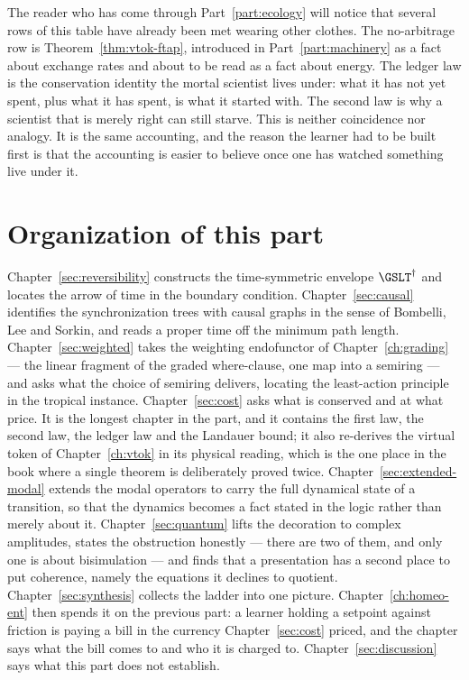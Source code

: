 The reader who has come through Part~\ref{part:ecology} will notice that
several rows of this table have already been met wearing other clothes.
The no-arbitrage row is Theorem~\ref{thm:vtok-ftap}, introduced in
Part~\ref{part:machinery} as a fact about exchange rates and about to be
read as a fact about energy.
The ledger law is the conservation identity the mortal scientist lives
under: what it has not yet spent, plus what it has spent, is what it
started with.
The second law is why a scientist that is merely right can still starve.
This is neither coincidence nor analogy.
It is the same accounting, and the reason the learner had to be built
first is that the accounting is easier to believe once one has watched
something live under it.

\section{Organization of this part}

Chapter~\ref{sec:reversibility} constructs the time-symmetric envelope
$\GSLT^\dagger$ and locates the arrow of time in the boundary condition.
Chapter~\ref{sec:causal} identifies the synchronization trees with causal
graphs in the sense of Bombelli, Lee and Sorkin, and reads a proper time
off the minimum path length.
Chapter~\ref{sec:weighted} takes the weighting endofunctor of
Chapter~\ref{ch:grading} --- the linear fragment of the graded where-clause,
one map into a semiring --- and asks what the choice of semiring delivers,
locating the least-action principle in the tropical instance.
Chapter~\ref{sec:cost} asks what is conserved and at what price.
It is the longest chapter in the part, and it contains the first law, the
second law, the ledger law and the Landauer bound; it also re-derives the
virtual token of Chapter~\ref{ch:vtok} in its physical reading, which is
the one place in the book where a single theorem is deliberately proved
twice.
Chapter~\ref{sec:extended-modal} extends the modal operators to carry the
full dynamical state of a transition, so that the dynamics becomes a fact
stated in the logic rather than merely about it.
Chapter~\ref{sec:quantum} lifts the decoration to complex amplitudes,
states the obstruction honestly --- there are two of them, and only one is
about bisimulation --- and finds that a presentation has a second place to
put coherence, namely the equations it declines to quotient.
Chapter~\ref{sec:synthesis} collects the ladder into one picture.
Chapter~\ref{ch:homeo-ent} then spends it on the previous part: a learner
holding a setpoint against friction is paying a bill in the currency
Chapter~\ref{sec:cost} priced, and the chapter says what the bill comes
to and who it is charged to.
Chapter~\ref{sec:discussion} says what this part does not establish.

